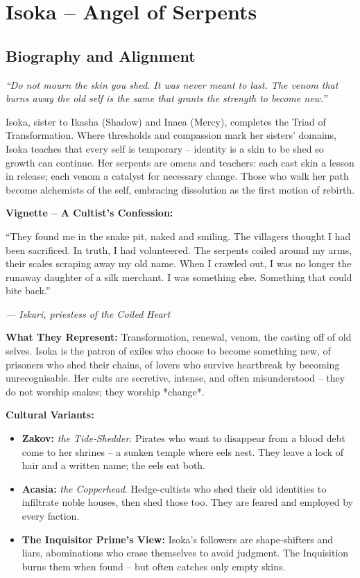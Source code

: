 \documentclass[10pt,a5paper]{book}
\begin{document}
\section{Isoka – Angel of Serpents}
\label{patron:isoka}

\subsection*{Biography and Alignment}

\textit{“Do not mourn the skin you shed. It was never meant to last. The venom that burns away the old self is the same that grants the strength to become new.”}

Isoka, sister to Ikasha (Shadow) and Inaea (Mercy), completes the Triad of Transformation. Where thresholds and compassion mark her sisters’ domains, Isoka teaches that every self is temporary – identity is a skin to be shed so growth can continue. Her serpents are omens and teachers: each cast skin a lesson in release; each venom a catalyst for necessary change. Those who walk her path become alchemists of the self, embracing dissolution as the first motion of rebirth.

\textbf{Vignette – A Cultist’s Confession:}
\epigraph{“They found me in the snake pit, naked and smiling. The villagers thought I had been sacrificed. In truth, I had volunteered. The serpents coiled around my arms, their scales scraping away my old name. When I crawled out, I was no longer the runaway daughter of a silk merchant. I was something else. Something that could bite back.”}{\textit{— Iskari, priestess of the Coiled Heart}}

\textbf{What They Represent:} Transformation, renewal, venom, the casting off of old selves. Isoka is the patron of exiles who choose to become something new, of prisoners who shed their chains, of lovers who survive heartbreak by becoming unrecognisable. Her cults are secretive, intense, and often misunderstood – they do not worship snakes; they worship *change*.

\textbf{Cultural Variants:}
\begin{itemize}
    \item \textbf{Zakov:} \textit{the Tide‑Shedder}. Pirates who want to disappear from a blood debt come to her shrines – a sunken temple where eels nest. They leave a lock of hair and a written name; the eels eat both.
    \item \textbf{Acasia:} \textit{the Copperhead}. Hedge‑cultists who shed their old identities to infiltrate noble houses, then shed those too. They are feared and employed by every faction.
    \item \textbf{The Inquisitor Prime’s View:} Isoka’s followers are shape‑shifters and liars, abominations who erase themselves to avoid judgment. The Inquisition burns them when found – but often catches only empty skins.
\end{itemize}
\end{document}
